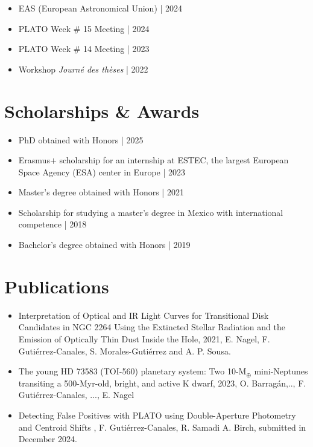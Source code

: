 \documentclass[11pt,a4paper]{article}
\begin{document}
		\begin{itemize}
			\item EAS (European Astronomical Union) | 2024
			\item PLATO Week \# 15 Meeting | 2024
			\item PLATO Week \# 14 Meeting | 2023
			\item Workshop \textit{Journé des thèses} | 2022
		\end{itemize}

	
	\section{Scholarships \& Awards}
	\begin{itemize}
		\item PhD obtained with Honors | 2025
		\item Erasmus$+$ scholarship for an internship at ESTEC, the largest European Space Agency (ESA) center in Europe | 2023
		\item Master's degree obtained with Honors | 2021
		\item Scholarship for studying a master's degree in Mexico with international competence | 2018
		\item Bachelor's degree obtained with Honors | 2019
	\end{itemize}
	
	\section{Publications}
	\begin{itemize}
		\item Interpretation of Optical and IR Light Curves for Transitional Disk Candidates in NGC 2264 Using the Extincted Stellar Radiation and the Emission of Optically Thin Dust Inside the Hole, 2021, E. Nagel, F. Gutiérrez-Canales, S. Morales-Gutiérrez and A. P. Sousa.
		\item The young HD 73583 (TOI-560) planetary system: Two 10-M$_{\oplus}$ mini-Neptunes transiting a 500-Myr-old, bright, and active K dwarf, 2023, O. Barrag\'an,.., F. Gutiérrez-Canales, ..., E. Nagel
		\item Detecting False Positives with PLATO using Double-Aperture Photometry and Centroid Shifts , F. Gutiérrez-Canales, R. Samadi A. Birch, submitted in December 2024.
	\end{itemize}
	
\end{document}
